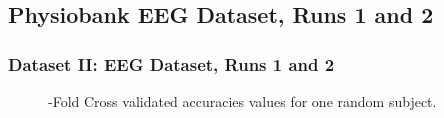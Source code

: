 \documentclass[11pt]{beamer}
\begin{document}
    \subsection{Physiobank EEG Dataset, Runs 1 and 2}
    \begin{frame}
      \frametitle{Dataset II: EEG Dataset, Runs 1 and 2 }
   \begin{figure}[thpb]
      \centering
      \setlength\fboxsep{0pt}
	  \setlength\fboxrule{0.5pt}
      \caption{-Fold Cross validated accuracies values for one random subject.}
      \label{figure2}
   \end{figure}          
    \end{frame}    
\end{document}
